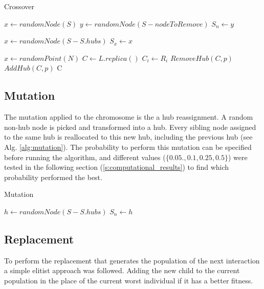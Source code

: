 \begin{algorithm}[H]
  \caption{Crossover}
  \label{alg:crossover}
  \begin{algorithmic}[1]
        \State $x \gets randomNode(S)$
        \State $y \gets randomNode(S - nodeToRemove)$
            \State $S_{n} \gets y$
          \EndIf
        \EndFor
      \EndWhile
    \EndFunction
    \item[]
        \State $x \gets randomNode(S - S.hubs)$
        \State $S_{x} \gets x$
      \EndWhile
    \EndFunction
  \item[]
  \State $x \gets randomPoint(N)$
  \State $C \gets L.replica()$
    \State $C_{i} \gets R_{i}$
  \EndFor
    $RemoveHub(C,p)$
    $AddHub(C,p)$
  \EndIf
  \State \Return C
  \end{algorithmic}
\end{algorithm}

\subsection{Mutation\label{ss:mutation}}

The mutation applied to the chromosome is the a hub reassignment. A random non-hub node is
picked and transformed into a hub. Every sibling node assigned to the same hub is reallocated
to this new hub, including the previous hub (see Alg. \ref{alg:mutation}).
The probability to perform this mutation can be specified before running the algorithm,
and different values ($\{0.05., 0.1, 0.25, 0.5\}$) were tested in the following section 
(\ref{s:computational_results}) to find which probability performed the best.

\begin{algorithm}[H]
  \caption{Mutation}
  \label{alg:mutation}
  \begin{algorithmic}[1]
    \State $h \gets randomNode(S - S.hubs)$
        \State $S_{n} \gets h$
      \EndIf
    \EndFor
  \end{algorithmic}
\end{algorithm}

\subsection{Replacement}

To perform the replacement that generates the population of the next interaction a simple
elitist approach was followed. Adding the new child to the current population in the place
of the current worst individual if it has a better fitness.


